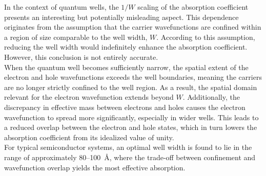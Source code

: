 In the context of quantum wells, the $1/W$ scaling of the absorption coefficient presents an interesting but potentially misleading aspect. This dependence originates from the assumption that the carrier wavefunctions are confined within a region of size comparable to the well width, $W$. According to this assumption, reducing the well width would indefinitely enhance the absorption coefficient. However, this conclusion is not entirely accurate.\\
When the quantum well becomes sufficiently narrow, the spatial extent of the electron and hole wavefunctions exceeds the well boundaries, meaning the carriers are no longer strictly confined to the well region. As a result, the spatial domain relevant for the electron wavefunction extends beyond $W$. Additionally, the discrepancy in effective mass between electrons and holes causes the electron wavefunction to spread more significantly, especially in wider wells. This leads to a reduced overlap between the electron and hole states, which in turn lowers the absorption coefficient from its idealized value of unity.\\
For typical semiconductor systems, an optimal well width is found to lie in the range of approximately 80–100~\AA, where the trade-off between confinement and wavefunction overlap yields the most effective absorption.

